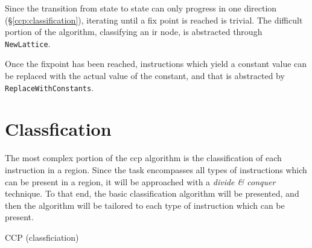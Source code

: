 Since the transition from state to state can only progress in one
direction (\S\ref{ccp:classification}), iterating until a fix point is
reached is trivial.  The difficult portion of the algorithm,
classifying an \ac{ir} node, is abstracted through
\texttt{NewLattice}.

Once the fixpoint has been reached, instructions which yield a
constant value can be replaced with the actual value of the constant,
and that is abstracted by \texttt{ReplaceWithConstants}.

\section{Classfication}

The most complex portion of the \ac{ccp} algorithm is the
classification of each instruction in a region.  Since the task
encompasses all types of instructions which can be present in a
region, it will be approached with a \emph{divide \& conquer}
technique.  To that end, the basic classification algorithm will be
presented, and then the algorithm will be tailored to each type of
instruction which can be present.

\begin{algorithm}[h!]
  \label{algo:ccp-classification}
  \caption{CCP (classficiation)}
  \begin{algorithmic}[1]
    \ELSE
    \STATE{}
    \STATE{}
    \ELSE
    \ENDIF
    \ENDIF
  \end{algorithmic}
\end{algorithm}

